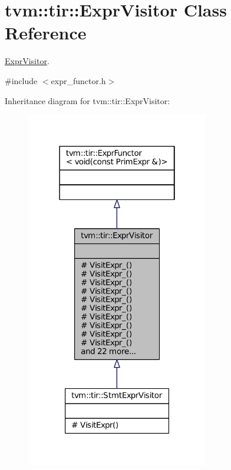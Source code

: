 \hypertarget{classtvm_1_1tir_1_1ExprVisitor}{}\section{tvm\+:\+:tir\+:\+:Expr\+Visitor Class Reference}
\label{classtvm_1_1tir_1_1ExprVisitor}


\hyperlink{classtvm_1_1tir_1_1ExprVisitor}{Expr\+Visitor}.  




{\ttfamily \#include $<$expr\+\_\+functor.\+h$>$}



Inheritance diagram for tvm\+:\+:tir\+:\+:Expr\+Visitor\+:
\nopagebreak
\begin{figure}[H]
\begin{center}
\leavevmode
\includegraphics[width=226pt]{classtvm_1_1tir_1_1ExprVisitor__inherit__graph}
\end{center}
\end{figure}


